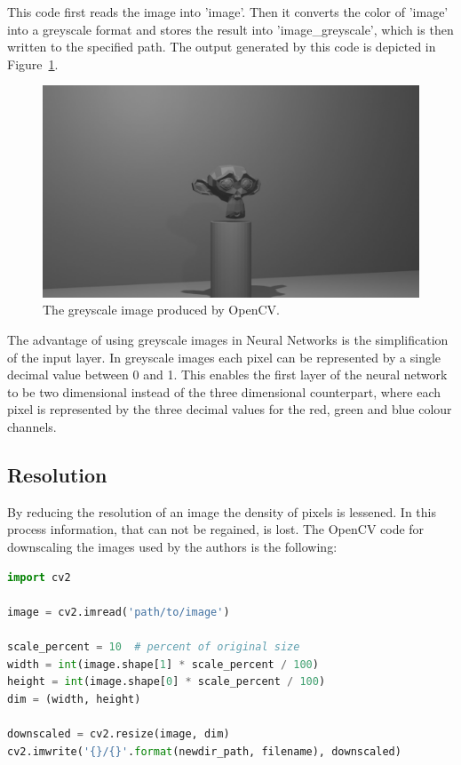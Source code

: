 This code first reads the image into 'image'. Then it converts the color of 'image' into a greyscale format and stores the result into 'image\_greyscale', which is then written to the specified path. The output generated by this code is depicted in Figure~\ref{pic:implementation_opencv_greyscale}.

\begin{figure}[h!]
	\centering
	\includegraphics[width=5in]{img/implementation_opencv_greyscale.png}
	\caption{The greyscale image produced by OpenCV.}
	\label{pic:implementation_opencv_greyscale}
\end{figure}

The advantage of using greyscale images in Neural Networks is the simplification of the input layer. In greyscale images each pixel can be represented by a single decimal value between 0 and 1. This enables the first layer of the neural network to be two dimensional instead of the three dimensional counterpart, where each pixel is represented by the three decimal values for the red, green and blue colour channels.

\subsection{Resolution}
By reducing the resolution of an image the density of pixels is lessened. In this process information, that can not be regained, is lost. The OpenCV code for downscaling the images used by the authors is the following:

\begin{lstlisting}[language=python]
import cv2

image = cv2.imread('path/to/image')

scale_percent = 10  # percent of original size
width = int(image.shape[1] * scale_percent / 100)
height = int(image.shape[0] * scale_percent / 100)
dim = (width, height)

downscaled = cv2.resize(image, dim)
cv2.imwrite('{}/{}'.format(newdir_path, filename), downscaled)
\end{lstlisting}

